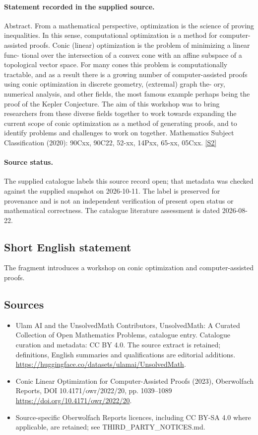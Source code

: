 \documentclass[11pt]{article}
\begin{document}
\paragraph{Statement recorded in the supplied source.}
Abstract. From a mathematical perspective, optimization is the science of proving inequalities. In this sense, computational optimization is a method for computer-assisted proofs. Conic (linear) optimization is the problem of minimizing a linear func- tional over the intersection of a convex cone with an affine subspace of a topological vector space. For many cones this problem is computationally tractable, and as a result there is a growing number of computer-assisted proofs using conic optimization in discrete geometry, (extremal) graph the- ory, numerical analysis, and other fields, the most famous example perhaps being the proof of the Kepler Conjecture. The aim of this workshop was to bring researchers from these diverse fields together to work towards expanding the current scope of conic optimization as a method of generating proofs, and to identify problems and challenges to work on together. Mathematics Subject Classification (2020): 90Cxx, 90C22, 52-xx, 14Pxx, 65-xx, 05Cxx. \href{https://doi.org/10.4171/owr/2022/20}{[S2]}
\paragraph{Source status.}
The supplied catalogue labels this source record open; that metadata was checked against the supplied snapshot on 2026-10-11. The label is preserved for provenance and is not an independent verification of present open status or mathematical correctness. The catalogue literature assessment is dated 2026-08-22.
\subsection{Short English statement}
The fragment introduces a workshop on conic optimization and computer-assisted proofs.
\subsection{Sources}
\begin{itemize}
\item[S1] Ulam AI and the UnsolvedMath Contributors, UnsolvedMath: A Curated Collection of Open Mathematics Problems, catalogue entry. Catalogue curation and metadata: CC BY 4.0. The source extract is retained; definitions, English summaries and qualifications are editorial additions.
\url{https://huggingface.co/datasets/ulamai/UnsolvedMath}.
\item[S2] Conic Linear Optimization for Computer-Assisted Proofs (2023), Oberwolfach Reports, DOI 10.4171/owr/2022/20, pp. 1039--1089
\url{https://doi.org/10.4171/owr/2022/20}.
\item Source-specific Oberwolfach Reports licences, including CC BY-SA 4.0 where applicable, are retained; see THIRD\_PARTY\_NOTICES.md.
\end{itemize}
\end{document}
